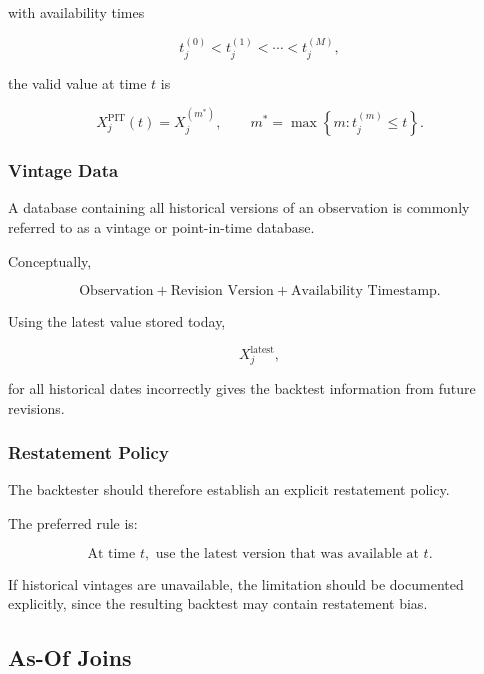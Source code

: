 \documentclass[11pt,a4paper]{article}
\begin{document}
with availability times

\begin{equation}
t_j^{(0)}
<
t_j^{(1)}
<
\cdots
<
t_j^{(M)},
\end{equation}

the valid value at time $t$ is

\begin{equation}
\boxed{
X_j^{\mathrm{PIT}}(t)
=
X_j^{(m^*)},
\qquad
m^*
=
\max
\left\{
m:
t_j^{(m)}
\leq
t
\right\}.
}
\end{equation}


\subsubsection{Vintage Data}

A database containing all historical versions of an observation is commonly
referred to as a vintage or point-in-time database.

Conceptually,

\begin{equation}
\boxed{
\text{Observation}
+
\text{Revision Version}
+
\text{Availability Timestamp}.
}
\end{equation}

Using the latest value stored today,

\begin{equation}
X_j^{\mathrm{latest}},
\end{equation}

for all historical dates incorrectly gives the backtest information from future
revisions.


\subsubsection{Restatement Policy}

The backtester should therefore establish an explicit restatement policy.

The preferred rule is:

\begin{equation}
\boxed{
\text{At time }t,
\text{ use the latest version that was available at }t.
}
\end{equation}

If historical vintages are unavailable, the limitation should be documented
explicitly, since the resulting backtest may contain restatement bias.


\subsection{As-Of Joins}
\label{subsec:asof_joins}
\end{document}
